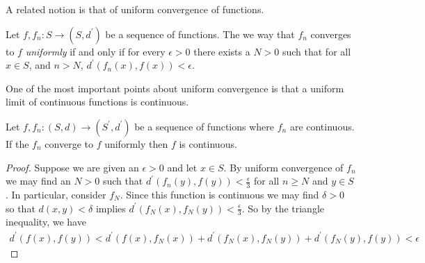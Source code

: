 A related notion is that of uniform convergence of functions.
\begin{defn}Let $f, f_n : S \to (S, d^\prime)$ be a sequence
  of functions.  The we way that $f_n$ converges to $f$
  \emph{uniformly} if and only if for every $\epsilon > 0$ there
  exists a $N > 0$ such that for all $x \in S$, and $n > N$, $d^\prime(f_n(x), f(x)) < \epsilon$.
\end{defn}

One of the most important points about uniform convergence is that a
uniform limit of continuous functions is continuous.
\begin{lem}\label{UniformLimitContinuousFunctionsIsContinuous}Let $f,
  f_n : (S,d) \to (S^\prime, d^\prime)$ be a sequence
  of functions where $f_n$ are continuous.  If the $f_n$ converge
  to $f$ uniformly then $f$ is continuous.
\end{lem}
\begin{proof}
Suppose we are given an $\epsilon > 0$ and let $x \in S$.  By uniform
convergence of $f_n$ we may find an $N > 0$ such that
$d^\prime(f_n(y), f(y)) < \frac{\epsilon}{3}$ for all $n \geq N$ and
$y \in S$.  In particular, consider $f_N$.  Since this function is
continuous we may find $\delta > 0$ so that $d(x,y) < \delta$ implies
$d^\prime(f_N(x), f_N(y)) < \frac{\epsilon}{3}$.  So by the triangle
inequality, we have 
\begin{align*}
d^\prime(f(x), f(y)) < d^\prime(f(x), f_N(x)) + d^\prime(f_N(x),
f_N(y)) + d^\prime(f_N(y), f(y)) < \epsilon
\end{align*}
\end{proof}

